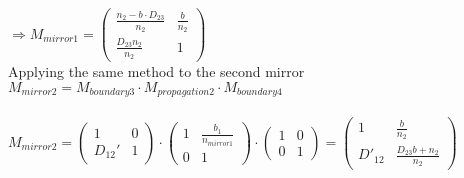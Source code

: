 \documentclass{article}
\begin{document}
$\Rightarrow{} M_{mirror 1}=\begin{pmatrix}
\frac{n_2-b \cdot D_{23}}{n_2} & \frac{b}{n_2}\\
\frac{D_{23}n_2}{n_2} & 1
\end{pmatrix}$
\\
Applying the same method to the second mirror
\\

$M_{mirror 2}= M_{boundary 3} \cdot M_{propagation 2} \cdot M_{boundary 4}$
\\\\
$M_{mirror 2} = \begin{pmatrix}
1 & 0\\
D_{12}' & 1
\end{pmatrix} \cdot \begin{pmatrix}
1 & \frac{b_1}{n_{mirror 1}}\\
0 & 1
\end{pmatrix} \cdot \begin{pmatrix}
1 & 0\\
0 & 1
\end{pmatrix}=\begin{pmatrix}
1 & \frac{b}{n_2}\\
D'_{12} & \frac{D_{23}b+n_2}{n_2}
\end{pmatrix}$
\\
\end{document}
